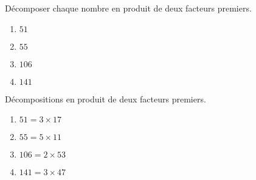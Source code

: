 \begin{exercice*}
    \label{N2exosBase012}
    Décomposer chaque nombre en produit de deux facteurs premiers.
    \begin{enumerate}
        \item $51$
        \item $55$
        \item $106$
        \item $141$
    \end{enumerate}

\end{exercice*}
\begin{corrige}
    Décompositions en produit de deux facteurs premiers.
    \begin{enumerate}
        \item $51=3\times 17$
        \item $55=5\times 11$
        \item $106=2\times 53$
        \item $141=3\times 47$
    \end{enumerate}    
\end{corrige}

